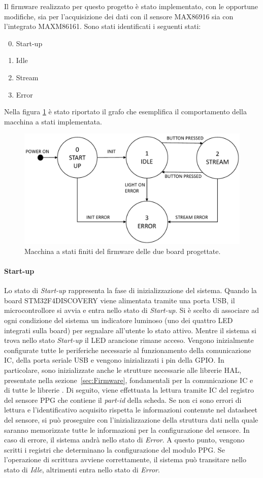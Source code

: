 Il firmware realizzato per questo progetto è stato implementato, con le opportune modifiche, sia per l'acquisizione dei dati con il sensore MAX86916 sia con l'integrato MAXM86161. Sono stati identificati i seguenti stati:
\begin{enumerate}
	\setcounter{enumi}{-1}
	\item Start-up
	\item Idle
	\item Stream
	\item Error
\end{enumerate}
Nella figura \ref{fig:FSM} è stato riportato il grafo che esemplifica il comportamento della macchina a stati implementata.
\begin{figure}[b]
	\centering
	\includegraphics[width=0.6\linewidth]{ImageFiles/Macchina a stati finiti/FSM}
	\caption{Macchina a stati finiti del firmware delle due board progettate.}
	\label{fig:FSM}
\end{figure}

\paragraph{Start-up}
Lo stato di \textit{Start-up} rappresenta la fase di inizializzazione del sistema. Quando la board STM32F4DISCOVERY viene alimentata tramite una porta USB, il microcontrollore si avvia e entra nello stato di \textit{Start-up}. Si è scelto di associare ad ogni condizione del sistema un indicatore luminoso (uno dei quattro LED integrati sulla board) per segnalare all'utente lo stato attivo. Mentre il sistema si trova nello stato \textit{Start-up} il LED arancione rimane acceso. Vengono inizialmente configurate tutte le periferiche necessarie al funzionamento della comunicazione IC, della porta seriale USB e vengono inizializzati i pin della GPIO. In particolare, sono inizializzate anche le strutture necessarie alle librerie HAL, presentate nella sezione~\ref{sec:Firmware}, fondamentali per la comunicazione IC e di tutte le librerie . Di seguito, viene effettuata la lettura tramite IC del registro del sensore PPG che contiene il \textit{part-id} della scheda. Se non ci sono errori di lettura e l'identificativo acquisito rispetta le informazioni contenute nel datasheet del sensore, si può proseguire con l'inizializzazione della struttura dati nella quale saranno memorizzate tutte le informazioni per la configurazione del sensore. In caso di errore, il sistema andrà nello stato di \textit{Error}. A questo punto, vengono scritti i registri che determinano la configurazione del modulo PPG. Se l'operazione di scrittura avviene correttamente, il sistema può transitare nello stato di \textit{Idle}, altrimenti entra nello stato di \textit{Error}.
